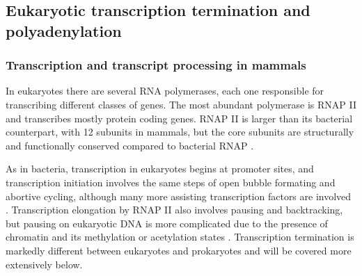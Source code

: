 %



\subsection{Eukaryotic transcription termination and polyadenylation}

\subsubsection{Transcription and transcript processing in mammals}
In eukaryotes there are several RNA polymerases, each one responsible for
transcribing different classes of genes. The most abundant polymerase is 
RNAP II and transcribes mostly protein coding genes. RNAP II is larger than its
bacterial counterpart, with 12 subunits in mammals, but the core subunits are
structurally and functionally conserved compared to bacterial RNAP
\cite{ebright_rna_2000}.

As in bacteria, transcription in eukaryotes begins at promoter sites, and
transcription initiation involves the same steps of open bubble formating and
abortive cycling, although many more assisting transcription factors are
involved \cite{wade_transition_2008}. Transcription elongation by RNAP II also
involves pausing and backtracking, but pausing on eukaryotic DNA is more
complicated due to the presence of chromatin and its methylation or acetylation
states \cite{sims_elongation_2004}. Transcription termination is markedly
different between eukaryotes and prokaryotes and will be covered more
extensively below.

